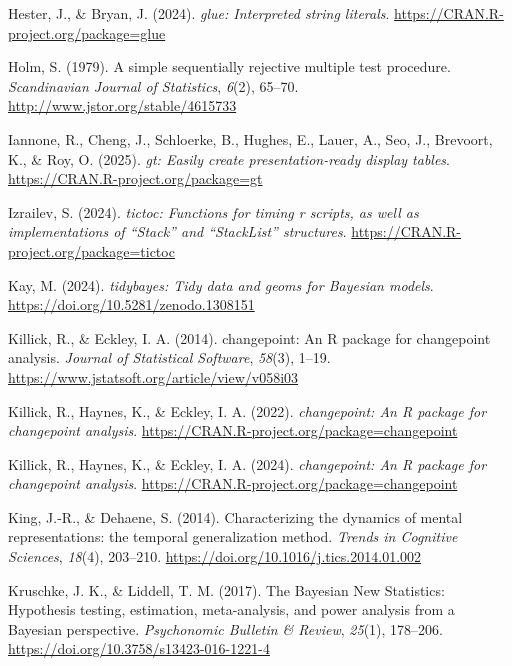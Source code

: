 \documentclass[
  man,
  floatsintext,
  longtable,
  a4paper,
  nolmodern,
  notxfonts,
  notimes,
  colorlinks=true,linkcolor=blue,citecolor=blue,urlcolor=blue]{apa7}
\newlength{\cslhangindent}
\newenvironment{CSLReferences}[2] %
 {\begin{list}{}{%
  \setlength{\itemindent}{0pt}
  \setlength{\leftmargin}{0pt}
  \setlength{\parsep}{0pt}
  \ifodd #1
   \setlength{\leftmargin}{\cslhangindent}
   \setlength{\itemindent}{-1\cslhangindent}
  \fi
  \setlength{\itemsep}{#2\baselineskip}}}
 {\end{list}}
\begin{document}
\begin{CSLReferences}{1}{0}
Hester, J., \& Bryan, J. (2024). \emph{{glue}: Interpreted string
literals}. \url{https://CRAN.R-project.org/package=glue}

Holm, S. (1979). A simple sequentially rejective multiple test
procedure. \emph{Scandinavian Journal of Statistics}, \emph{6}(2),
65--70. \url{http://www.jstor.org/stable/4615733}

Iannone, R., Cheng, J., Schloerke, B., Hughes, E., Lauer, A., Seo, J.,
Brevoort, K., \& Roy, O. (2025). \emph{{gt}: Easily create
presentation-ready display tables}.
\url{https://CRAN.R-project.org/package=gt}

Izrailev, S. (2024). \emph{{tictoc}: Functions for timing r scripts, as
well as implementations of {``{Stack}''} and {``{StackList}''}
structures}. \url{https://CRAN.R-project.org/package=tictoc}

Kay, M. (2024). \emph{{tidybayes}: Tidy data and geoms for {Bayesian}
models}. \url{https://doi.org/10.5281/zenodo.1308151}

Killick, R., \& Eckley, I. A. (2014). {changepoint}: An {R} package for
changepoint analysis. \emph{Journal of Statistical Software},
\emph{58}(3), 1--19.
\url{https://www.jstatsoft.org/article/view/v058i03}

Killick, R., Haynes, K., \& Eckley, I. A. (2022). \emph{{changepoint}:
An {R} package for changepoint analysis}.
\url{https://CRAN.R-project.org/package=changepoint}

Killick, R., Haynes, K., \& Eckley, I. A. (2024). \emph{{changepoint}:
An {R} package for changepoint analysis}.
\url{https://CRAN.R-project.org/package=changepoint}

King, J.-R., \& Dehaene, S. (2014). Characterizing the dynamics of
mental representations: the temporal generalization method. \emph{Trends
in Cognitive Sciences}, \emph{18}(4), 203--210.
\url{https://doi.org/10.1016/j.tics.2014.01.002}

Kruschke, J. K., \& Liddell, T. M. (2017). The Bayesian New Statistics:
Hypothesis testing, estimation, meta-analysis, and power analysis from a
Bayesian perspective. \emph{Psychonomic Bulletin \& Review},
\emph{25}(1), 178--206. \url{https://doi.org/10.3758/s13423-016-1221-4}


\end{CSLReferences}
\end{document}

